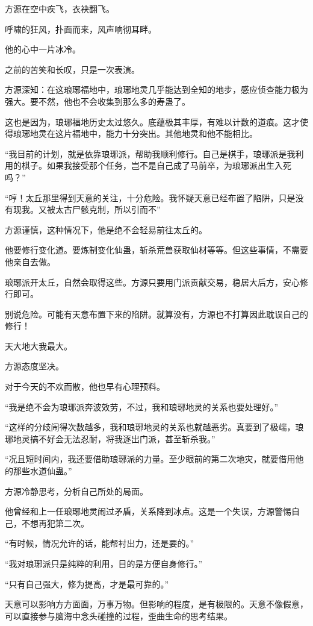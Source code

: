 \begin{this_body}
方源在空中疾飞，衣袂翻飞。

呼啸的狂风，扑面而来，风声响彻耳畔。

他的心中一片冰冷。

之前的苦笑和长叹，只是一次表演。

方源深知：在这琅琊福地中，琅琊地灵几乎能达到全知的地步，感应侦查能力极为强大。要不然，他也不会收集到那么多的寿蛊了。

这也是因为，琅琊福地历史太过悠久。底蕴极其丰厚，有难以计数的道痕。这才使得琅琊地灵在这片福地中，能力十分突出。其他地灵和他不能相比。

“我目前的计划，就是依靠琅琊派，帮助我顺利修行。自己是棋手，琅琊派是我利用的棋子。如果我接受那个任务，岂不是自己成了马前卒，为琅琊派出生入死吗？”

“哼！太丘那里得到天意的关注，十分危险。我怀疑天意已经布置了陷阱，只是没有现我。又被太古尸骸克制，所以引而不”

方源谨慎，这种情况下，他是绝不会轻易前往太丘的。

他要修行变化道。要炼制变化仙蛊，斩杀荒兽获取仙材等等。但这些事情，不需要他亲自去做。

琅琊派开太丘，自然会取得这些。方源只要用门派贡献交易，稳居大后方，安心修行即可。

别说危险。可能有天意布置下来的陷阱。就算没有，方源也不打算因此耽误自己的修行！

天大地大我最大。

方源态度坚决。

对于今天的不欢而散，他也早有心理预料。

“我是绝不会为琅琊派奔波效劳，不过，我和琅琊地灵的关系也要处理好。”

“这样的分歧闹得次数越多，我和琅琊地灵的关系也就越恶劣。真要到了极端，琅琊地灵搞不好会无法忍耐，将我逐出门派，甚至斩杀我。”

“况且短时间内，我还要借助琅琊派的力量。至少眼前的第二次地灾，就要借用他的那些水道仙蛊。”

方源冷静思考，分析自己所处的局面。

他曾经和上一任琅琊地灵闹过矛盾，关系降到冰点。这是一个失误，方源警惕自己，不想再犯第二次。

“有时候，情况允许的话，能帮衬出力，还是要的。”

“我对琅琊派只是纯粹的利用，目的是方便自身修行。”

“只有自己强大，修为提高，才是最可靠的。”

天意可以影响方方面面，万事万物。但影响的程度，是有极限的。天意不像假意，可以直接参与脑海中念头碰撞的过程，歪曲生命的思考结果。


\end{this_body}
